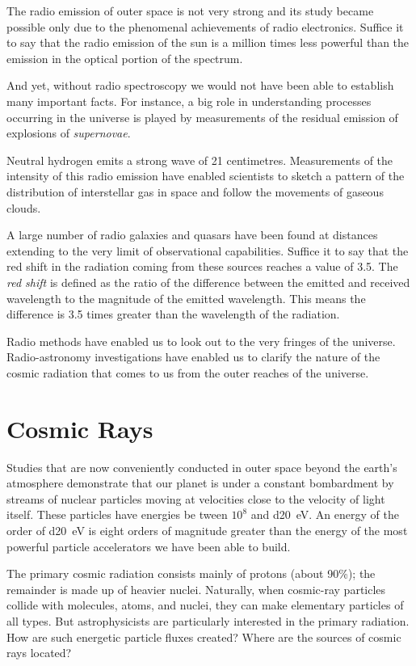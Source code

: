 The radio emission of outer space is not very strong and its study became possible only due to the phenomenal achievements of radio electronics. Suffice it to say that the radio emission of the sun is a million times less powerful than the emission in the optical portion of the spectrum.

And yet, without radio spectroscopy we would not have been able to establish many important facts. For instance, a big role in understanding processes occurring in the universe is played by measurements of the residual emis­sion of explosions of \emph{supernovae}.

Neutral hydrogen emits a strong wave of 21 centime­tres. Measurements of the intensity of this radio emission have enabled scientists to sketch a pattern of the distri­bution of interstellar gas in space and follow the move­ments of gaseous clouds.

A large number of radio galaxies and quasars have been found at distances extending to the very limit of obser­vational capabilities. Suffice it to say that the red shift in the radiation coming from these sources reaches a value of 3.5. The \emph{red shift} is defined as the ratio of the difference between the emitted and received wavelength to the magnitude of the emitted wavelength. This means the difference is 3.5 times greater than the wavelength of the radiation.

Radio methods have enabled us to look out to the very fringes of the universe. Radio-astronomy investigations have enabled us to clarify the nature of the cosmic radiation that comes to us from the outer reaches of the universe.

\section{Cosmic Rays}

Studies that are now conveniently conducted in outer space beyond the earth’s atmosphere demonstrate that our planet is under a constant bombardment by streams of nuclear particles moving at velocities close to the velocity of light itself. These particles have energies be­ tween $10^{8}$ and \SI{d20}{\electronvolt}. An energy of the order of \SI{d20}{\electronvolt} is eight orders of magnitude greater than the energy of the most powerful particle accelerators we have been able to build.

The primary cosmic radiation consists mainly of protons (about 90\%); the remainder is made up of heavier nuclei. Naturally, when cosmic-ray particles collide with molecules, atoms, and nuclei, they can make elementary particles of all types. But astrophysicists are particularly interested in the primary radiation. How are such ener­getic particle fluxes created? Where are the sources of cosmic rays located?

